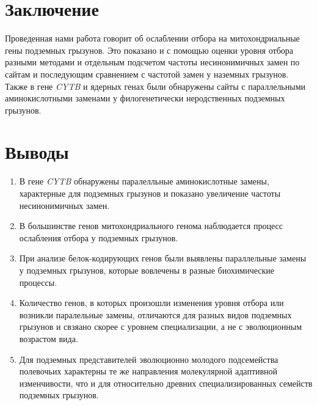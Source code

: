 
\chapter{Заключение} 

Проведенная нами работа говорит об ослаблении отбора на митохондриальные гены подземных грызунов. Это показано и с помощью оценки уровня отбора разными методами и отдельным подсчетом частоты несинонимичных замен по сайтам и последующим сравнением с частотой замен у наземных грызунов. Также в гене \textit{CYTB} и ядерных генах были обнаружены сайты с параллельными аминокислотными заменами у филогенетически неродственных подземных грызунов.


\chapter{Выводы} 

\begin{enumerate}
	
\item В гене \textit{CYTB} обнаружены паралелльные аминокислотные замены, характерные для подземных грызунов и показано увеличение частоты несинонимичных замен.

\item В большинстве генов митохондриального генома наблюдается процесс ослабления отбора у подземных грызунов. 
 
\item При анализе белок-кодирующих генов были выявлены параллельные замены у подземных грызунов, которые вовлечены в разные биохимические процессы. 

\item Количество генов, в которых произошли изменения уровня отбора или возникли паралельные замены, отличаются для разных видов подземных грызунов и свзяано скорее с уровнем специализации, а не с эволюционным возрастом вида. 

\item Для подземных представителей эволюционно молодого подсемейства полевочьих характерны те же направления молекулярной адаптивной изменчивости, что и для относительно древних специализированных семейств подземных грызунов.
 

\end{enumerate}

